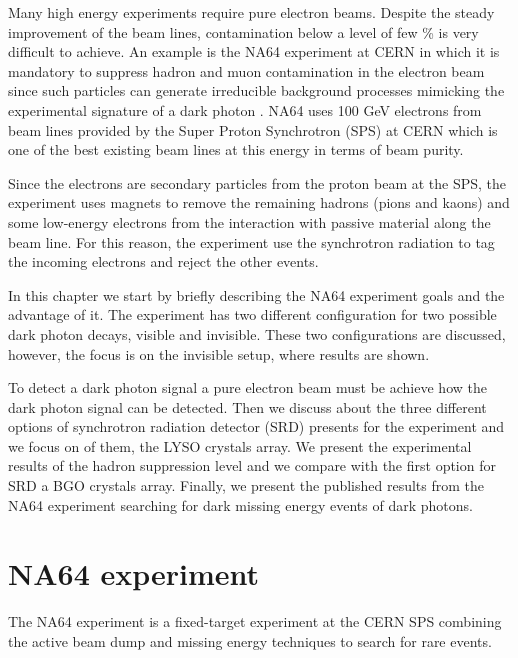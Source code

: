 
Many high energy experiments require pure electron beams. Despite the steady improvement of the beam lines,
contamination below a level of few \% is very difficult to achieve. An example is the NA64 experiment\cite{na64} at CERN
in which it is mandatory to suppress hadron and muon contamination in the electron beam since such particles can
generate irreducible background processes mimicking the experimental signature of a dark photon \cite{prlpaper, proposal}.
NA64 uses 100 GeV electrons from beam lines provided by the Super Proton Synchrotron (SPS) at CERN which is one of the
best existing beam lines at this energy in terms of beam purity\cite{sps}.\par

Since the electrons are secondary particles from the proton beam at the SPS, the experiment uses magnets to remove the
remaining hadrons (pions and kaons) and some low-energy electrons from the interaction with passive material along the
beam line. For this reason, the experiment use the synchrotron radiation to tag the incoming electrons and reject the
other events.\par

In this chapter we start by briefly describing the NA64 experiment goals and the advantage of it. The experiment has two
different configuration for two possible dark photon decays, visible and invisible. These two configurations are
discussed, however, the focus is on the invisible setup, where results are shown.\par
To detect a dark photon signal a pure electron beam must be achieve
how the dark photon signal can be detected. Then
we discuss about the three different options of synchrotron radiation detector (SRD) presents for the experiment and we
focus on of them, the LYSO crystals array. We present the experimental results of the hadron suppression level and we
compare with the first option for SRD a BGO crystals array. Finally, we present the published results from the NA64
experiment searching for dark missing energy events of dark photons.\par


\section{NA64 experiment}

The NA64 experiment is a fixed-target experiment at the CERN SPS combining the active beam dump and missing energy
techniques to search for rare events.\par

